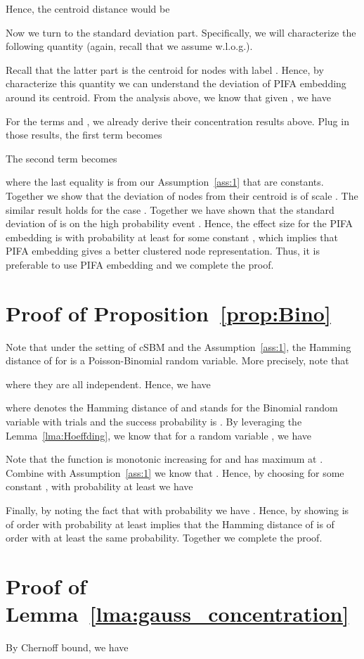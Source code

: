 \documentclass{article} \usepackage{iclr2022_conference,times}
\begin{document}
Hence, the centroid distance would be


Now we turn to the standard deviation part. Specifically, we will characterize the following quantity (again, recall that we assume  w.l.o.g.).

Recall that the latter part is the centroid for nodes with label . Hence, by characterize this quantity we can understand the deviation of PIFA embedding around its centroid. From the analysis above, we know that given , we have

For the terms  and , we already derive their concentration results above. Plug in those results, the first term becomes


The second term becomes

where the last equality is from our Assumption~\ref{ass:1} that  are constants. Together we show that the deviation of nodes from their centroid is of scale . The similar result holds for the case . Together we have shown that the standard deviation of  is  on the high probability event . Hence, the effect size for the PIFA embedding is  with probability at least  for some constant , which implies that PIFA embedding gives a better clustered node representation. Thus, it is preferable to use PIFA embedding and we complete the proof.
\section{Proof of Proposition~\ref{prop:Bino}}
Note that under the setting of cSBM and the Assumption~\ref{ass:1}, the Hamming distance of  for  is a Poisson-Binomial random variable. More precisely, note that

where they are all independent. Hence, we have

where  denotes the Hamming distance of  and  stands for the Binomial random variable with  trials and the success probability is . By leveraging the Lemma~\ref{lma:Hoeffding}, we know that for a random variable , we have

 Note that the function  is monotonic increasing for  and has maximum at . Combine with Assumption~\ref{ass:1} we know that . Hence, by choosing  for some constant , with probability at least  we have
 
Finally, by noting the fact that with probability  we have . Hence, by showing  is of order  with probability at least  implies that the Hamming distance of  is of order  with at least the same probability. Together we complete the proof.
 
\section{Proof of Lemma~\ref{lma:gauss_concentration}}
By Chernoff bound, we have
\end{document}
